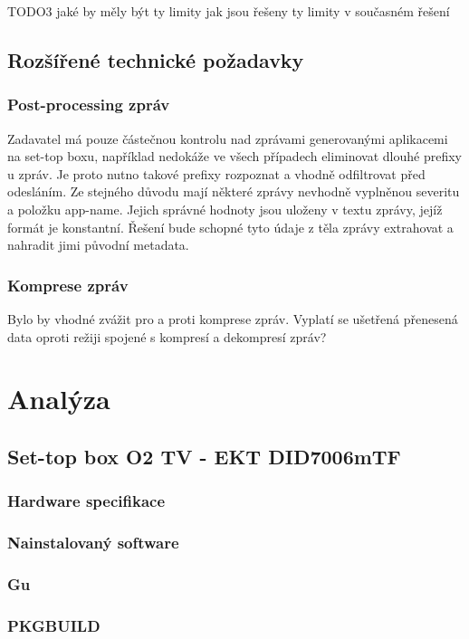 \documentclass[thesis=B,czech]{FITthesis}[2012/06/26]
\begin{document}
TODO3
jaké by měly být ty limity
jak jsou řešeny ty limity v současném řešení

\section{Rozšířené technické požadavky}

\subsection{Post-processing zpráv}
Zadavatel má pouze částečnou kontrolu nad zprávami generovanými aplikacemi na set-top boxu, například nedokáže ve všech případech eliminovat dlouhé prefixy u zpráv. Je proto nutno takové prefixy rozpoznat a vhodně odfiltrovat před odesláním. Ze stejného důvodu mají některé zprávy nevhodně vyplněnou severitu a položku app-name. Jejich správné hodnoty jsou uloženy v textu zprávy, jejíž formát je konstantní. Řešení bude schopné tyto údaje z těla zprávy extrahovat a nahradit jimi původní metadata.

\subsection{Komprese zpráv}
Bylo by vhodné zvážit pro a proti komprese zpráv. Vyplatí se ušetřená přenesená data oproti režiji spojené s kompresí a dekompresí zpráv?

\chapter{Analýza}

\section{Set-top box O2 TV - EKT DID7006mTF}
\subsection*{Hardware specifikace}
\subsection*{Nainstalovaný software}
\subsection*{Gu}
\subsection*{PKGBUILD}
\end{document}
